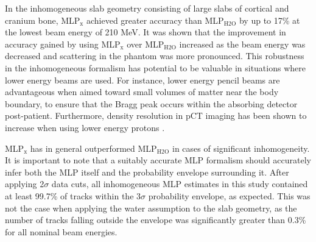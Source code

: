 \documentclass[preprint,times]{elsarticle}
\begin{document}
In the inhomogeneous slab geometry consisting of large slabs of cortical and cranium bone, MLP$_\mathrm{x}$ achieved greater accuracy than MLP$_\mathrm{H2O}$ by up to 17\% at the lowest beam energy of 210 MeV. It was shown that the improvement in accuracy gained by using MLP$_\mathrm{x}$ over MLP$_\mathrm{H2O}$ increased as the beam energy was decreased and scattering in the phantom was more pronounced. This robustness in the inhomogeneous formalism has potential to be valuable in situations where lower energy beams are used. For instance, lower energy pencil beams are advantageous when aimed toward small volumes of matter near the body boundary, to ensure that the Bragg peak occurs within the absorbing detector post-patient. Furthermore, density resolution in pCT imaging has been shown to increase when using lower energy protons \citep{schultedensityres}.

MLP$_\mathrm{x}$ has in general outperformed MLP$_\mathrm{H2O}$ in cases of significant inhomogeneity. It is important to note that a suitably accurate MLP formalism should accurately infer both the MLP itself and the probability envelope surrounding it. After applying 2$\sigma$ data cuts, all inhomogeneous MLP estimates in this study contained at least 99.7\% of tracks within the 3$\sigma$ probability envelope, as expected. This was not the case when applying the water assumption to the slab geometry, as the number of tracks falling outside the envelope was significantly greater than 0.3\% for all nominal beam energies.
\end{document}

